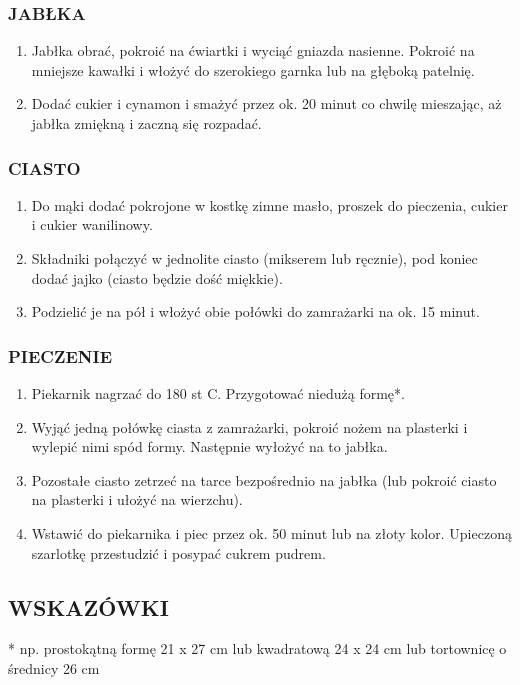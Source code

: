 \documentclass[12pt, letterpaper,titlepage]{article}
\begin{document}
\subsubsection{JABŁKA}
\begin{enumerate}[•]
\item Jabłka obrać, pokroić na ćwiartki i wyciąć gniazda nasienne. Pokroić na mniejsze kawałki i włożyć do szerokiego garnka lub na głęboką patelnię.
\item Dodać cukier i cynamon i smażyć przez ok. 20 minut co chwilę mieszając, aż jabłka zmiękną i zaczną się rozpadać.
\end{enumerate}
\subsubsection{CIASTO}
\begin{enumerate}[•]
\item Do mąki dodać pokrojone w kostkę zimne masło, proszek do pieczenia, cukier i cukier wanilinowy. 
\item Składniki połączyć w jednolite ciasto (mikserem lub ręcznie), pod koniec dodać jajko (ciasto będzie dość miękkie).
\item Podzielić je na pół i włożyć obie połówki do zamrażarki na ok. 15 minut.
\end{enumerate}
\subsubsection{PIECZENIE}
\begin{enumerate}[•]
\item Piekarnik nagrzać do 180 st C. Przygotować niedużą formę*.
\item Wyjąć jedną połówkę ciasta z zamrażarki, pokroić nożem na plasterki i wylepić nimi spód formy. Następnie wyłożyć na to jabłka.
\item Pozostałe ciasto zetrzeć na tarce bezpośrednio na jabłka (lub pokroić ciasto na plasterki i ułożyć na wierzchu).
\item Wstawić do piekarnika i piec przez ok. 50 minut lub na złoty kolor. Upieczoną szarlotkę przestudzić i posypać cukrem pudrem.
\end{enumerate}
\subsection{WSKAZÓWKI}
 * np. prostokątną formę 21 x 27 cm lub kwadratową 24 x 24 cm lub tortownicę o średnicy 26 cm 
\end{document}
